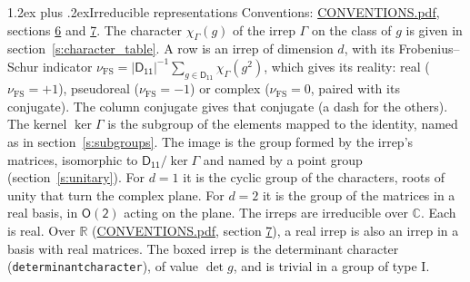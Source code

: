 \documentclass[10pt,a4paper]{article}
\makeatletter
\renewcommand\section{\@startsection{section}{1}{\z@}{-3ex plus -1ex minus -.2ex}%
  {1.2ex plus .2ex}{\normalfont\large\sffamily\bfseries\color{parttitle}}}
\numberwithin{equation}{section}
\newcommand{\grp}[1]{\mathsf{#1}}
\newcommand{\irchar}[1]{\chi_{#1}}
\newcommand{\fsind}{\nu_{\mathrm{FS}}}
\makeatother
\begin{document}
\section{Irreducible representations}\label{s:irreps}
Conventions: \href{../../CONVENTIONS.pdf}{CONVENTIONS.pdf}, sections \href{../../CONVENTIONS.pdf\#conv.6}{6} and \href{../../CONVENTIONS.pdf\#conv.7}{7}.
\leavevmode\label{n:function.character}\label{n:irrep.Gamma}The character $\irchar{\Gamma}(g)$ of the irrep $\Gamma$ on the class of $g$ is given in section~\ref{s:character_table}.
\leavevmode\label{n:index.dimension}\label{n:index.frobenius}\label{n:head.irrep}\label{n:head.reality}A row is an irrep of dimension $d$, with its Frobenius--Schur indicator $\fsind = |\grp{D_{11}}|^{-1}\allowbreak\sum_{g\in\grp{D_{11}}}\irchar{\Gamma}(g^2)$, which gives its reality: real ($\fsind = +1$), pseudoreal ($\fsind = -1$) or complex ($\fsind = 0$, paired with its conjugate). \label{n:head.conjugate}The column conjugate gives that conjugate (a dash for the others). \label{n:head.kernel}The kernel $\ker\Gamma$ is the subgroup of the elements mapped to the identity, named as in section~\ref{s:subgroups}. \label{n:head.image}The image is the group formed by the irrep's matrices, isomorphic to $\grp{D_{11}}/\ker\Gamma$ and named by a point group (section~\ref{s:unitary}). For $d = 1$ it is the cyclic group of the characters, roots of unity that turn the complex plane. For $d = 2$ it is the group of the matrices in a real basis, in $\grp{O(2)}$ acting on the plane. The irreps are irreducible over $\mathbb{C}$. Each is real. Over $\mathbb{R}$ (\href{../../CONVENTIONS.pdf}{CONVENTIONS.pdf}, section \href{../../CONVENTIONS.pdf\#conv.7}{7}), a real irrep is also an irrep in a basis with real matrices. \label{n:mark.determinant}The boxed irrep is the determinant character (\texttt{determinantcharacter}), of value $\det g$, and is trivial in a group of type I.
\setlength{\emergencystretch}{2em}\par\setlength{\emergencystretch}{0pt}
\end{document}
